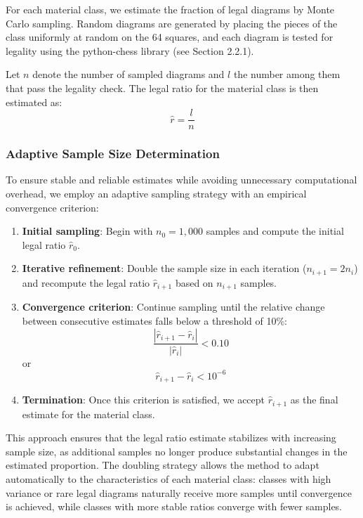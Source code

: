 \documentclass[12pt]{article}
\begin{document}
For each material class, we estimate the fraction of legal diagrams by Monte Carlo sampling. Random diagrams are generated by placing the pieces of the class uniformly at random on the 64 squares, and each diagram is tested for legality using the python-chess library (see Section 2.2.1).

Let $n$ denote the number of sampled diagrams and $l$ the number among them that pass the legality check. The legal ratio for the material class is then estimated as:
\begin{equation}
\hat{r} = \frac{l}{n}
\end{equation}

\subsubsection{Adaptive Sample Size Determination}

To ensure stable and reliable estimates while avoiding unnecessary computational overhead, we employ an adaptive sampling strategy with an empirical convergence criterion:

\begin{enumerate}
\item \textbf{Initial sampling}: Begin with $n_0 = 1{,}000$ samples and compute the initial legal ratio $\hat{r}_0$.

\item \textbf{Iterative refinement}: Double the sample size in each iteration ($n_{i+1} = 2n_i$) and recompute the legal ratio $\hat{r}_{i+1}$ based on $n_{i+1}$ samples.

\item \textbf{Convergence criterion}: Continue sampling until the relative change between consecutive estimates falls below a threshold of 10\%:
\begin{equation}
\frac{|\hat{r}_{i+1} - \hat{r}_i|}{|\hat{r}_i|} < 0.10
\end{equation}
or 
\begin{equation}
\hat{r}_{i+1} - \hat{r}_i< 10^{-6}
\end{equation}

\item \textbf{Termination}: Once this criterion is satisfied, we accept $\hat{r}_{i+1}$ as the final estimate for the material class.
\end{enumerate}

This approach ensures that the legal ratio estimate stabilizes with increasing sample size, as additional samples no longer produce substantial changes in the estimated proportion. The doubling strategy allows the method to adapt automatically to the characteristics of each material class: classes with high variance or rare legal diagrams naturally receive more samples until convergence is achieved, while classes with more stable ratios converge with fewer samples.
\end{document}
